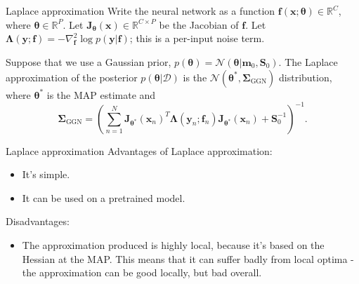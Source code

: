 \documentclass{beamer}
\begin{document}
\begin{frame}{Laplace approximation}
    Write the neural network as a function $\boldsymbol{f}(\boldsymbol{x}; \boldsymbol{\theta}) \in \mathbb{R}^C$, where $\boldsymbol{\theta} \in \mathbb{R}^P$. Let $\boldsymbol{J}_{\boldsymbol{\theta}}(\boldsymbol{x}) \in \mathbb{R}^{C \times P}$ be the Jacobian of $\boldsymbol{f}$. Let $\boldsymbol{\Lambda}(\boldsymbol{y}; \boldsymbol{f}) = -\nabla_{\boldsymbol{f}}^2\log p(\boldsymbol{y} | \boldsymbol{f})$; this is a per-input noise term.
    
    \medskip

    Suppose that we use a Gaussian prior, $p(\boldsymbol{\theta}) = \mathcal{N}(\boldsymbol{\theta} | \boldsymbol{m}_0, \boldsymbol{S}_0)$. The Laplace approximation of the posterior $p(\boldsymbol{\theta} | \mathcal{D})$ is the $\mathcal{N}(\boldsymbol{\theta}^*, \boldsymbol{\Sigma}_{\text{GGN}})$ distribution, where $\boldsymbol{\theta}^*$ is the MAP estimate and
    \[
    \boldsymbol{\Sigma}_{\text{GGN}} = \left(\sum_{n = 1}^N \boldsymbol{J}_{\boldsymbol{\theta}^*}(\boldsymbol{x}_n)^T\boldsymbol{\Lambda}(\boldsymbol{y}_n; \boldsymbol{f}_n)\boldsymbol{J}_{\boldsymbol{\theta}^*}(\boldsymbol{x}_n) + \boldsymbol{S}_0^{-1}\right)^{-1}.
    \]
\end{frame}

\begin{frame}{Laplace approximation}
    Advantages of Laplace approximation:
    \begin{itemize}
        \item It's simple.
        \item It can be used on a pretrained model.
    \end{itemize}
    Disadvantages:
    \begin{itemize}
        \item The approximation produced is highly local, because it's based on the Hessian at the MAP. This means that it can suffer badly from local optima - the approximation can be good locally, but bad overall.
    \end{itemize}
\end{frame}
\end{document}

